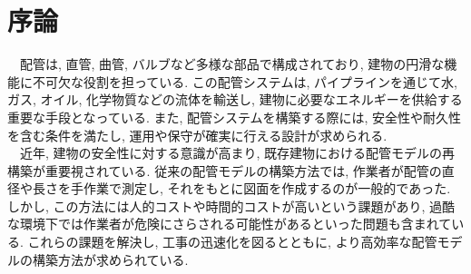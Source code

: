 \chapter{序論}
　配管は, 直管, 曲管, バルブなど多様な部品で構成されており, 建物の円滑な機能に不可欠な役割を担っている. 
この配管システムは, パイプラインを通じて水, ガス, オイル, 化学物質などの流体を輸送し, 建物に必要なエネルギーを供給する重要な手段となっている. 
また, 配管システムを構築する際には, 安全性や耐久性を含む条件を満たし, 運用や保守が確実に行える設計が求められる\cite{bib:1}\cite{bib:2}. \\
　近年, 建物の安全性に対する意識が高まり, 既存建物における配管モデルの再構築が重要視されている. 
従来の配管モデルの構築方法では, 作業者が配管の直径や長さを手作業で測定し, それをもとに図面を作成するのが一般的であった. 
しかし, この方法には人的コストや時間的コストが高いという課題があり, 過酷な環境下では作業者が危険にさらされる可能性があるといった問題も含まれている. 
これらの課題を解決し, 工事の迅速化を図るとともに, より高効率な配管モデルの構築方法が求められている\cite{bib:3}\cite{bib:4}. 


